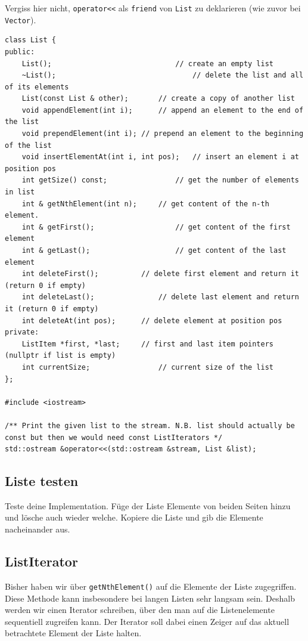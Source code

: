 Vergiss hier nicht, \texttt{operator<<} als \texttt{friend} von \texttt{List} zu deklarieren (wie zuvor bei \texttt{Vector}).

\begin{lstlisting}
class List {
public:
	List();								// create an empty list
	~List();								// delete the list and all of its elements
	List(const List & other);		// create a copy of another list
	void appendElement(int i);		// append an element to the end of the list
	void prependElement(int i);	// prepend an element to the beginning of the list
	void insertElementAt(int i, int pos);	// insert an element i at position pos
	int getSize() const;				// get the number of elements in list
	int & getNthElement(int n);		// get content of the n-th element.
	int & getFirst();					// get content of the first element
	int & getLast();					// get content of the last element
	int deleteFirst();			// delete first element and return it (return 0 if empty)
	int deleteLast();				// delete last element and return it (return 0 if empty)
	int deleteAt(int pos);		// delete element at position pos
private:
	ListItem *first, *last;		// first and last item pointers (nullptr if list is empty)
	int currentSize;				// current size of the list
};

#include <iostream>

/** Print the given list to the stream. N.B. list should actually be const but then we would need const ListIterators */
std::ostream &operator<<(std::ostream &stream, List &list);
\end{lstlisting}

\subsection{Liste testen}
Teste deine Implementation.
Füge der Liste Elemente von beiden Seiten hinzu und lösche auch wieder welche.
Kopiere die Liste und gib die Elemente nacheinander aus.

\subsection{ListIterator}
Bisher haben wir über \texttt{getNthElement()} auf die Elemente der Liste zugegriffen.
Diese Methode kann insbesondere bei langen Listen sehr langsam sein.
Deshalb werden wir einen Iterator schreiben, über den man auf die Listenelemente sequentiell zugreifen kann.
Der Iterator soll dabei einen Zeiger auf das aktuell betrachtete Element der Liste halten.


